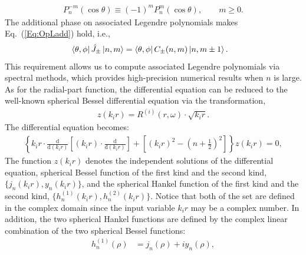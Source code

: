 \documentclass[journal=jacsat,manuscript=article,layout=traditional]{achemso}
\newcommand*\diff{\mathrm{d}}
\newcommand*\p[2]{\frac{\partial{#1} }{\partial {#2}}}
\begin{document}
\begin{appendix}
\begin{align}
    P_n^{-m}(\cos\theta) \equiv (-1)^mP_n^m(\cos\theta), \qquad m\geq 0.
\end{align}
The additional phase on associated Legendre polynomials makes Eq.~(\ref{Eq:OpLadd}) hold, i.e.,
\begin{align}
    &\bra{\theta,\phi}\hat{J}_\pm\ket{n,m}=\bra{\theta,\phi}C_\pm(n,m)\ket{n,m\pm1}.%
\end{align}
This requirement allows us to compute associated Legendre polynomials via spectral methods, which provides high-precision numerical results when $n$ is large.
As for the radial-part function, the differential equation can be reduced to the well-known spherical Bessel differential equation via the transformation,
\begin{align}
    z(k_ir) = R^{(i)}(r,\omega)\cdot\sqrt{k_ir}.
\end{align}
The differential equation becomes:
\begin{align}
    \left\{k_ir\cdot\frac{\diff}{\diff (k_ir)}\left[(k_ir)\cdot\frac{\diff }{\diff{(k_ir)}}\right]+\left[(k_ir)^2-\left(n+\frac{1}{2}\right)^2\right]\right\}z(k_ir) = 0,
\end{align}
The function $z(k_ir)$ denotes the independent solutions of the differential equation, spherical Bessel function of the first kind and the second kind, $\{j_n(k_ir),y_n(k_ir)\}$, and the spherical Hankel function of the first kind and the second kind, $\{h_n^{(1)}(k_ir),h_n^{(2)}(k_ir)\}$.
Notice that both of the set are defined in the complex domain since the input variable $k_ir$ may be a complex number.
In addition, the two spherical Hankel functions are defined by the complex linear combination of the two spherical Bessel functions:
\begin{align}
    h_n^{(1)}(\rho) &= j_n(\rho) + iy_n(\rho),\\

\end{align}
\end{appendix}
\end{document}
